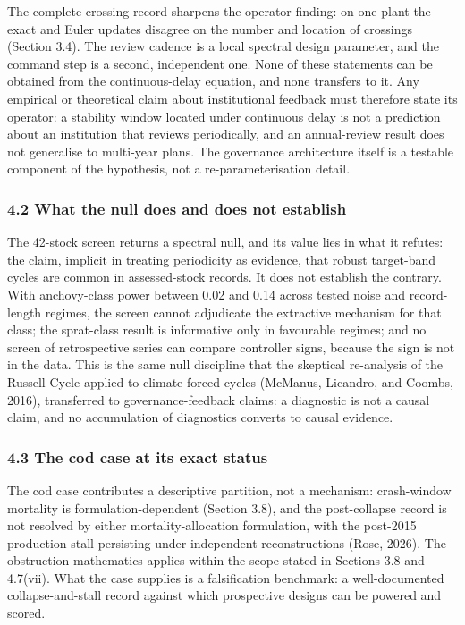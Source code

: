 \documentclass[11pt]{article}
\begin{document}
The complete crossing record sharpens the operator finding: on one plant the exact and Euler updates disagree on the number and location of crossings (Section 3.4). The review cadence is a local spectral design parameter, and the
command step is a second, independent one. None of these statements can
be obtained from the continuous-delay equation, and none transfers to
it. Any empirical or theoretical claim about institutional feedback must
therefore state its operator: a stability window located under
continuous delay is not a prediction about an institution that reviews
periodically, and an annual-review result does not generalise to
multi-year plans. The governance architecture itself is a testable
component of the hypothesis, not a re-parameterisation detail.

\subsubsection{4.2 What the null does and does not
establish}\label{what-the-null-does-and-does-not-establish}

The 42-stock screen returns a spectral null, and its value lies in what
it refutes: the claim, implicit in treating periodicity as evidence,
that robust target-band cycles are common in assessed-stock records. It
does not establish the contrary. With anchovy-class power between 0.02
and 0.14 across tested noise and record-length regimes, the screen
cannot adjudicate the extractive mechanism for that class; the
sprat-class result is informative only in favourable regimes; and no
screen of retrospective series can compare controller signs, because the
sign is not in the data. This is the same null discipline that the
skeptical re-analysis of the Russell Cycle applied to climate-forced
cycles (McManus, Licandro, and Coombs, 2016), transferred to
governance-feedback claims: a diagnostic is not a causal claim, and no
accumulation of diagnostics converts to causal evidence.

\subsubsection{4.3 The cod case at its exact
status}\label{the-cod-case-at-its-exact-status}

The cod case contributes a descriptive partition, not a mechanism:
crash-window mortality is formulation-dependent (Section 3.8), and the
post-collapse record is not resolved by either mortality-allocation
formulation, with the post-2015 production stall persisting under
independent reconstructions (Rose, 2026). The obstruction mathematics
applies within the scope stated in Sections 3.8 and 4.7(vii). What the
case supplies is a falsification benchmark: a well-documented
collapse-and-stall record against which prospective designs can be
powered and scored.
\end{document}
